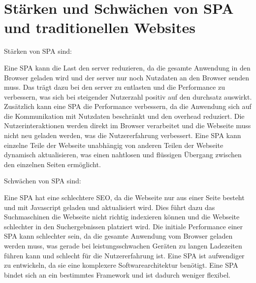 \section{Stärken und Schwächen von \ac{SPA} und traditionellen Websites}



Stärken von \ac{SPA} sind:

Eine \ac{SPA} kann die Last den \gls{server} reduzieren, da die gesamte Anwendung in den Browser geladen wird und der \gls{server} nur noch Nutzdaten an den Browser senden muss.
Das trägt dazu bei den \gls{server} zu entlasten und die Performance zu verbessern, was sich bei steigender Nutzerzahl positiv auf den \gls{durchsatz} auswirkt.
Zusätzlich kann eine \ac{SPA} die Performance verbessern, da die Anwendung sich auf die Kommunikation mit Nutzdaten beschränkt und den \gls{overhead} reduziert.
Die Nutzerinteraktionen werden direkt im Browser verarbeitet und die Webseite muss nicht neu geladen werden, was die Nutzererfahrung verbessert.
Eine \ac{SPA} kann einzelne Teile der Webseite unabhängig von anderen Teilen der Webseite dynamisch aktualisieren, was einen nahtlosen und flüssigen Übergang zwischen den einzelnen Seiten ermöglicht.

Schwächen von \ac{SPA} sind:

Eine \ac{SPA} hat eine schlechtere \ac{SEO}, da die Webseite nur aus einer Seite besteht und mit Javascript geladen und aktualisiert wird.
Dies führt dazu das Suchmaschinen die Webseite nicht richtig indexieren können und die Webseite schlechter in den Suchergebnissen platziert wird.
Die initiale Performance einer \ac{SPA} kann schlechter sein, da die gesamte Anwendung vom Browser geladen werden muss, was gerade bei leistungsschwachen Geräten zu langen Ladezeiten führen kann und schlecht für die Nutzererfahrung ist.
Eine \ac{SPA} ist aufwendiger zu entwickeln, da sie eine komplexere Softwarearchitektur benötigt.
Eine \ac{SPA} bindet sich an ein bestimmtes Framework und ist dadurch weniger flexibel.

